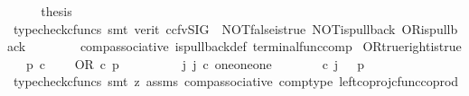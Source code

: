 \begin{isabellebody}
\ \ \isamarkupfalse%
\ \isamarkupfalse%
\ {\isacharquery}{\kern0pt}thesis\ \isanewline
\ \ \ \ \isamarkupfalse%
\ {\isacharparenleft}{\kern0pt}typecheck{\isacharunderscore}{\kern0pt}cfuncs{\isacharcomma}{\kern0pt}\ smt\ {\isacharparenleft}{\kern0pt}verit{\isacharcomma}{\kern0pt}\ ccfv{\isacharunderscore}{\kern0pt}SIG{\isacharparenright}{\kern0pt}\ \ NOT{\isacharunderscore}{\kern0pt}false{\isacharunderscore}{\kern0pt}is{\isacharunderscore}{\kern0pt}true\ NOT{\isacharunderscore}{\kern0pt}is{\isacharunderscore}{\kern0pt}pullback\ OR{\isacharunderscore}{\kern0pt}is{\isacharunderscore}{\kern0pt}pullback\isanewline
\ \ \ \ \ \ \ \ comp{\isacharunderscore}{\kern0pt}associative{}\ is{\isacharunderscore}{\kern0pt}pullback{\isacharunderscore}{\kern0pt}def\ terminal{\isacharunderscore}{\kern0pt}func{\isacharunderscore}{\kern0pt}comp{\isacharparenright}{\kern0pt}\isanewline
{}\isamarkupfalse%
%
\endisatagproof
{\isafoldproof}%
%
\isadelimproof
\isanewline
%
\endisadelimproof
\isanewline
{}\isamarkupfalse%
\ OR{\isacharunderscore}{\kern0pt}true{\isacharunderscore}{\kern0pt}right{\isacharunderscore}{\kern0pt}is{\isacharunderscore}{\kern0pt}true{\isacharcolon}{\kern0pt}\isanewline
\ \ \ {\isachardoublequoteopen}p\ {\isasymin}\isactrlsub c\ {\isasymOmega}{\isachardoublequoteclose}\isanewline
\ \ \ {\isachardoublequoteopen}OR\ {\isasymcirc}\isactrlsub c\ {\isasymlangle}p{\isacharcomma}{\kern0pt}{\isasymt}{\isasymrangle}\ {\isacharequal}{\kern0pt}\ {\isasymt}{\isachardoublequoteclose}\isanewline
%
\isadelimproof
%
\endisadelimproof
%
\isatagproof
{}\isamarkupfalse%
\ {\isacharminus}{\kern0pt}\ \isanewline
\ \ \isamarkupfalse%
\ {\isachardoublequoteopen}{\isasymexists}\ j{\isachardot}{\kern0pt}\ j\ {\isasymin}\isactrlsub c\ one{\isasymCoprod}{\isacharparenleft}{\kern0pt}one{\isasymCoprod}one{\isacharparenright}{\kern0pt}\ {\isasymand}\ {\isacharparenleft}{\kern0pt}{\isasymlangle}{\isasymt}{\isacharcomma}{\kern0pt}\ {\isasymt}{\isasymrangle}{\isasymamalg}\ {\isacharparenleft}{\kern0pt}{\isasymlangle}{\isasymt}{\isacharcomma}{\kern0pt}\ {\isasymf}{\isasymrangle}\ {\isasymamalg}{\isasymlangle}{\isasymf}{\isacharcomma}{\kern0pt}\ {\isasymt}{\isasymrangle}{\isacharparenright}{\kern0pt}{\isacharparenright}{\kern0pt}\ {\isasymcirc}\isactrlsub c\ j\ \ {\isacharequal}{\kern0pt}\ {\isasymlangle}p{\isacharcomma}{\kern0pt}{\isasymt}{\isasymrangle}{\isachardoublequoteclose}\isanewline
\ \ \ \ \isamarkupfalse%
\ {\isacharparenleft}{\kern0pt}typecheck{\isacharunderscore}{\kern0pt}cfuncs{\isacharcomma}{\kern0pt}\ smt\ {\isacharparenleft}{\kern0pt}z{}{\isacharparenright}{\kern0pt}\ assms\ comp{\isacharunderscore}{\kern0pt}associative{}\ comp{\isacharunderscore}{\kern0pt}type\ left{\isacharunderscore}{\kern0pt}coproj{\isacharunderscore}{\kern0pt}cfunc{\isacharunderscore}{\kern0pt}coprod\isanewline

\end{isabellebody}
